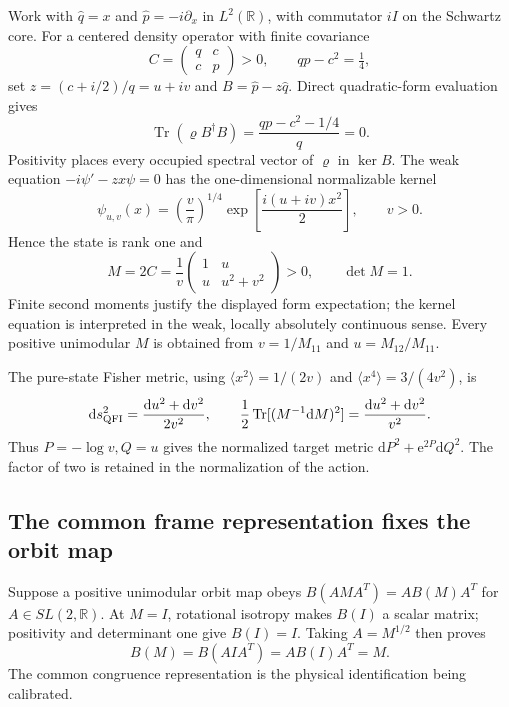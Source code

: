 \documentclass[11pt]{article}
\newcommand{\Tr}{\operatorname{Tr}}
\newcommand{\R}{\mathbb R}
\newcommand{\dd}{\mathrm d}
\newcommand{\e}{\mathrm e}
\begin{document}
Work with $\widehat q=x$ and $\widehat p=-i\partial_x$ in $L^2(\R)$, with commutator $iI$ on the Schwartz core. For a centered density operator with finite covariance
\begin{equation}
 C=\begin{pmatrix}q&c\\c&p\end{pmatrix}>0,\qquad qp-c^2=\tfrac14,
\end{equation}
set $z=(c+i/2)/q=u+iv$ and $B=\widehat p-z\widehat q$. Direct quadratic-form evaluation gives
\begin{equation}
 \Tr(\varrho B^\dagger B)=\frac{qp-c^2-1/4}{q}=0.
\end{equation}
Positivity places every occupied spectral vector of $\varrho$ in $\ker B$. The weak equation $-i\psi'-zx\psi=0$ has the one-dimensional normalizable kernel
\begin{equation}
 \psi_{u,v}(x)=\left(\frac v\pi\right)^{1/4}\exp\left[\frac{i(u+iv)x^2}{2}\right],\qquad v>0.
\end{equation}
Hence the state is rank one and
\begin{equation}
 M=2C=\frac1v\begin{pmatrix}1&u\\u&u^2+v^2\end{pmatrix}>0,\qquad\det M=1.
\end{equation}
Finite second moments justify the displayed form expectation; the kernel equation is interpreted in the weak, locally absolutely continuous sense. Every positive unimodular $M$ is obtained from $v=1/M_{11}$ and $u=M_{12}/M_{11}$.

The pure-state Fisher metric, using $\langle x^2\rangle=1/(2v)$ and $\langle x^4\rangle=3/(4v^2)$, is
\begin{equation}
 \dd s^2_{\rm QFI}=\frac{\dd u^2+\dd v^2}{2v^2},\qquad
 \frac12\Tr[(M^{-1}\dd M)^2]=\frac{\dd u^2+\dd v^2}{v^2}.
\end{equation}
Thus $P=-\log v,Q=u$ gives the normalized target metric $\dd P^2+\e^{2P}\dd Q^2$. The factor of two is retained in the normalization of the action.

\subsection{The common frame representation fixes the orbit map}

Suppose a positive unimodular orbit map obeys $B(AMA^T)=AB(M)A^T$ for $A\in SL(2,\R)$. At $M=I$, rotational isotropy makes $B(I)$ a scalar matrix; positivity and determinant one give $B(I)=I$. Taking $A=M^{1/2}$ then proves
\begin{equation}
 B(M)=B(AIA^T)=AB(I)A^T=M.
\end{equation}
The common congruence representation is the physical identification being calibrated.
\end{document}

